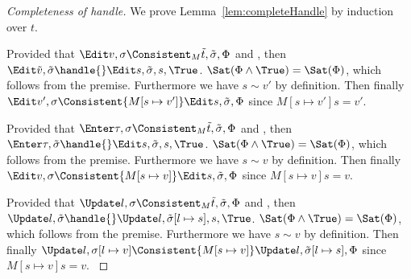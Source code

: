 \begin{proof}[Completeness of handle]
  We prove Lemma~\ref{lem:completeHandle} by induction over $t$.\\

    {
    Provided that $\Edit v,\sigma\Consistent_{M}\tilde{t},\tilde{\sigma},\Phi$ and ,
    then $\Edit\tilde{v},\tilde{\sigma}\handle{}\Edit s,\tilde{\sigma},s,\True$.
    $\Sat(\Phi\land\True)=\Sat(\Phi)$, which follows from the premise.
    Furthermore we have $s\sim v'$ by definition.
    Then finally $\Edit v',\sigma\Consistent{M[s\mapsto v']}\Edit s,\tilde{\sigma},\Phi$ since $M[s\mapsto v'] s = v'$.


    }

    {
    Provided that $\Enter \tau,\sigma\Consistent_{M}\tilde{t},\tilde{\sigma},\Phi$ and ,
    then $\Enter\tau,\tilde{\sigma}\handle{}\Edit s,\tilde{\sigma},s,\True$.
    $\Sat(\Phi\land\True)=\Sat(\Phi)$, which follows from the premise.
    Furthermore we have $s\sim v$ by definition.
    Then finally $\Edit v,\sigma\Consistent{M[s\mapsto v]}\Edit s,\tilde{\sigma},\Phi$ since $M[s\mapsto v] s = v$.
    }

    {
    Provided that $\Update l,\sigma\Consistent_{M}\tilde{t},\tilde{\sigma},\Phi$ and ,
    then $\Update l,\tilde{\sigma}\handle{}\Update l,\tilde{\sigma}[l\mapsto s],s,\True$.
    $\Sat(\Phi\land\True)=\Sat(\Phi)$, which follows from the premise.
    Furthermore we have $s\sim v$ by definition.
    Then finally $\Update l,\sigma[l\mapsto v]\Consistent{M[s\mapsto v]}\Update l,\tilde{\sigma}[l\mapsto s],\Phi$ since $M[s\mapsto v] s = v$.
     }


\end{proof}
